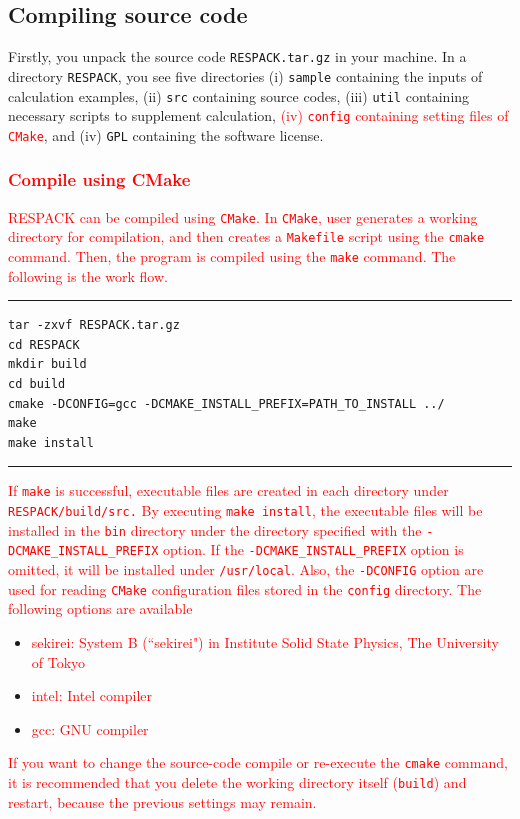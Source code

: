 \documentclass{article}
\newcommand{\tr}[1]{\textcolor{red}{#1}}
\begin{document}
\subsection{\label{compile}Compiling source code}

Firstly, you unpack the source code \verb+RESPACK.tar.gz+ in your machine. In a directory \verb+RESPACK+, you see five directories (i) \verb+sample+ containing the inputs of calculation examples, (ii) \verb+src+ containing source codes, (iii) \verb+util+ containing necessary scripts to supplement calculation, 
\tr{(iv) {\tt config} containing setting files of {\tt CMake}}, and (iv) {\tt GPL} containing the software license. 

\subsubsection{\tr{Compile using CMake}}
\tr{RESPACK can be compiled using {\tt CMake}. In {\tt CMake}, user generates a working directory for compilation, and then creates a {\tt Makefile} script using the {\tt cmake} command. Then, the program is compiled using the {\tt make} command. The following is the work flow.}
\vspace{3mm}\hrule
\begin{verbatim}
tar -zxvf RESPACK.tar.gz
cd RESPACK
mkdir build
cd build
cmake -DCONFIG=gcc -DCMAKE_INSTALL_PREFIX=PATH_TO_INSTALL ../
make
make install
\end{verbatim}
\hrule\vspace{3mm}
\tr{If {\tt make} is successful, executable files are created in each directory under {\tt RESPACK/build/src.} By executing {\tt make install}, the executable files will be installed in the {\tt bin} directory under the directory specified with the {\tt -DCMAKE\_INSTALL\_PREFIX} option. If the {\tt -DCMAKE\_INSTALL\_PREFIX} option is omitted, it will be installed under {\tt /usr/local}. Also, the {\tt -DCONFIG} option are used for reading {\tt CMake} configuration files stored in the {\tt config} directory. The following options are available}
\begin{itemize}
    \item \tr{
    sekirei: System B (``sekirei") in Institute Solid State Physics, The University of Tokyo}
    \item \tr{
    intel: Intel compiler }
    \item \tr{
    gcc: GNU compiler}
\end{itemize}
\tr{If you want to change the source-code compile or re-execute the {\tt cmake} command, it is recommended that you delete the working directory itself ({\tt build}) and restart, because the previous settings may remain.}
\end{document}
